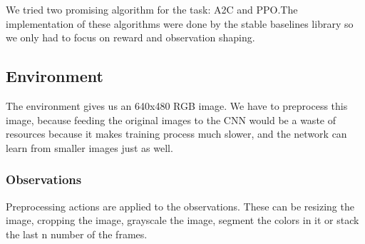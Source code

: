 \documentclass{article}
\begin{document}
We tried two promising algorithm for the task: A2C and PPO.The implementation of these algorithms were done by the stable baselines library  \cite{stablebase} so we only had to focus on reward and observation shaping.

\subsection{\normalsize{Environment}}

The environment gives us an 640x480 RGB image.
We have to preprocess this image, because feeding the original images to the CNN would be a waste of resources because it makes training process much slower, and the network can learn from smaller images just as well.

\subsubsection{\normalsize{Observations}}

Preprocessing actions are applied to the observations. These can be resizing the image, cropping the image, grayscale the image, segment the colors in it or stack the last n number of the frames.
\end{document}
